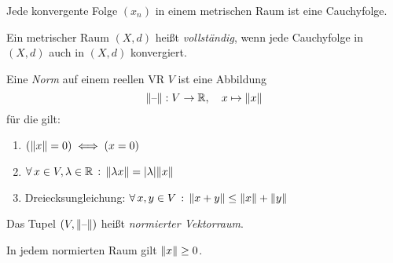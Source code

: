 \documentclass{cheat-sheet}
\begin{document}
\begin{satz}
Jede konvergente Folge $(x_n)$ in einem metrischen Raum ist eine Cauchyfolge.
\end{satz}

\begin{defn}
Ein metrischer Raum $(X, d)$ heißt \emph{vollständig}, wenn jede Cauchyfolge in $(X, d)$ auch in $(X, d)$ konvergiert.
\end{defn}


\begin{defn}
Eine \emph{Norm} auf einem reellen VR $V$ ist eine Abbildung
\[
  \lVert\text{--}\rVert : V \to \mathbb{R}, \quad
  x \mapsto \lVert x\rVert
\]
für die gilt:
\begin{enumerate}
  \item $(\lVert x\rVert = 0) \iff (x = 0)$
  \item $\forall \, {x \in V, \lambda \in \mathbb{R}} \,:\, \lVert\lambda x\rVert = \lvert\lambda\rvert \lVert x\rVert$
  \item Dreiecksungleichung: $\forall \, {x, y \in V} \,:\, \lVert x + y\rVert \le \lVert x\rVert + \lVert y\rVert$
\end{enumerate}
Das Tupel $(V, \lVert\text{--}\rVert)$ heißt \emph{normierter Vektorraum}.
\end{defn}

\begin{bem}
In jedem normierten Raum gilt $\lVert x\rVert \ge 0$.
\end{bem}
\end{document}

